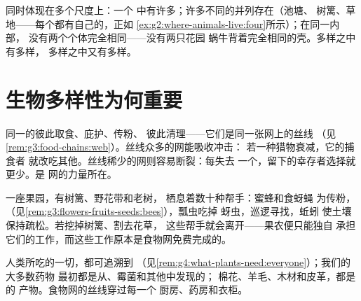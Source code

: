 \begin{remark}[各尺度上的多样性]\label{rem:g5:biodiversity:scales}
同时体现在多个尺度上：一个
中有许多；许多不同的并列存在（池塘、
树篱、草地——每个都有自己的，正如
\cref{ex:g2:where-animals-live:four}所示）；在同一内部，
没有两个个体完全相同——没有两只花园
蜗牛背着完全相同的壳。多样之中有多样，
多样之中又有多样。
\end{remark}

\section{生物多样性为何重要}

\begin{proposition}[网需要它的丝线]\label{prop:g5:biodiversity:web}
同一的彼此取食、庇护、传粉、
彼此清理——它们是同一张网上的丝线
（见\cref{rem:g3:food-chains:web}）。丝线众多的网能吸收冲击：
若一种猎物衰减，它的捕食者
就改吃其他。丝线稀少的网则容易断裂：每失去
一个，留下的幸存者选择就更少。是
网的力量所在。
\end{proposition}
\admitted

\begin{example}[果园的考验]\label{ex:g5:biodiversity:orchard}
一座果园，有树篱、野花带和老树，
栖息着数十种帮手：蜜蜂和食蚜蝇
为传粉，
（见\cref{rem:g3:flowers-fruits-seeds:bees}），瓢虫吃掉
蚜虫，巡逻寻找，蚯蚓
使土壤保持疏松。若挖掉树篱、割去花草，
这些帮手就会离开——果农便只能独自
承担它们的工作，而这些工作原本是食物网免费完成的。
\end{example}

\begin{example}[人类依赖食物网生存]\label{ex:g5:biodiversity:people}
人类所吃的一切，都可追溯到
（见\cref{rem:g4:what-plants-need:everyone}）；我们的大多数药物
最初都是从、霉菌和其他中发现的；
棉花、羊毛、木材和皮革，都是的
产物。食物网的丝线穿过每一个
厨房、药房和衣柜。
\end{example}

